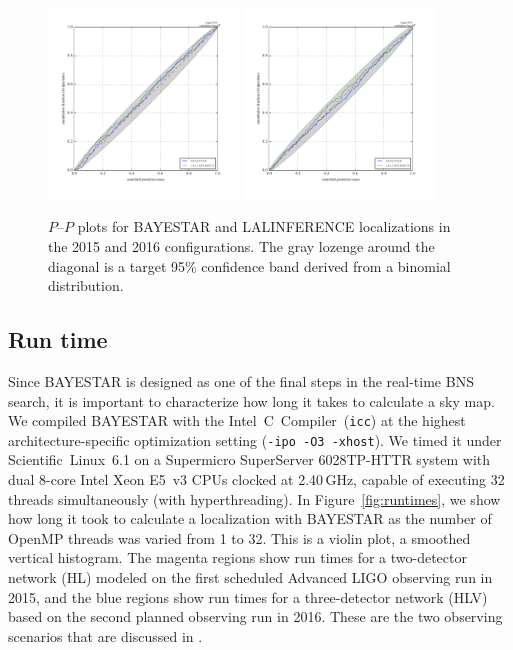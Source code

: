 \documentclass[amsmath,amssymb,aps,prx,reprint,nopreprintnumbers,nofootinbib]{revtex4-1}
\begin{document}
\begin{figure}
    \begin{center}
        \includegraphics[width=0.45\textwidth]{2015-pp}
        \includegraphics[width=0.45\textwidth]{2016-pp}
    \end{center}
    \caption[\acs{BAYESTAR} $P$\nobreakdashes--$P$ plots]{\label{fig:pp}$P$\nobreakdashes--$P$ plots for \ac{BAYESTAR} and LALINFERENCE localizations in the 2015 and 2016 configurations. The gray lozenge around the diagonal is a target 95\% confidence band derived from a binomial distribution.}
\end{figure}

\subsection{Run time}
\label{sec:run-time}

Since \ac{BAYESTAR} is designed as one of the final steps in the real\nobreakdashes-time \ac{BNS} search, it is important to characterize how long it takes to calculate a sky map. We compiled \ac{BAYESTAR} with the Intel~C~Compiler~(\texttt{icc}) at the highest architecture\nobreakdashes-specific optimization setting (\texttt{-ipo~-O3~-xhost}). We timed it under Scientific~Linux~6.1 on a Supermicro SuperServer 6028TP\nobreakdashes-HTTR system with dual 8\nobreakdashes-core Intel Xeon E5~v3 CPUs clocked at 2.40\,GHz, capable of executing 32 threads simultaneously (with hyperthreading). In Figure~\ref{fig:runtimes}, we show how long it took to calculate a localization with \ac{BAYESTAR} as the number of OpenMP threads was varied from 1 to 32. This is a violin plot, a smoothed vertical histogram. The magenta regions show run times for a two\nobreakdashes-detector network (HL) modeled on the first scheduled Advanced \ac{LIGO} observing run in 2015, and the blue regions show run times for a three\nobreakdashes-detector network (HLV) based on the second planned observing run in 2016. These are the two observing scenarios that are discussed in \cite{FirstTwoYears}.
\end{document}
